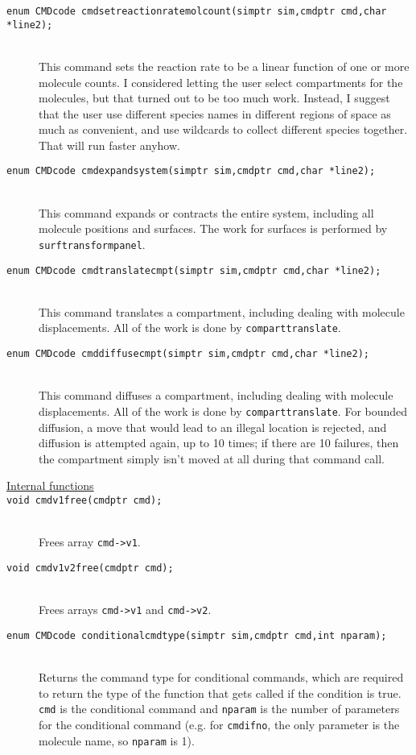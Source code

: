\documentclass {scrbook}
\newcommand {\ttt} {\texttt}
\begin{document}
\begin{description}
\item[\ttt{enum CMDcode cmdsetreactionratemolcount(simptr sim,cmdptr cmd,char *line2);}]
\hfill \\
This command sets the reaction rate to be a linear function of one or more molecule counts. I considered letting the user select compartments for the molecules, but that turned out to be too much work. Instead, I suggest that the user use different species names in different regions of space as much as convenient, and use wildcards to collect different species together. That will run faster anyhow.

\item[\ttt{enum CMDcode cmdexpandsystem(simptr sim,cmdptr cmd,char *line2);}]
\hfill \\
This command expands or contracts the entire system, including all molecule positions and surfaces. The work for surfaces is performed by \ttt{surftransformpanel}.

\item[\ttt{enum CMDcode cmdtranslatecmpt(simptr sim,cmdptr cmd,char *line2);}]
\hfill \\
This command translates a compartment, including dealing with molecule displacements. All of the work is done by \ttt{comparttranslate}.

\item[\ttt{enum CMDcode cmddiffusecmpt(simptr sim,cmdptr cmd,char *line2);}]
\hfill \\
This command diffuses a compartment, including dealing with molecule displacements. All of the work is done by \ttt{comparttranslate}. For bounded diffusion, a move that would lead to an illegal location is rejected, and diffusion is attempted again, up to 10 times; if there are 10 failures, then the compartment simply isn't moved at all during that command call.

\item[\underline{Internal functions}]

\item[\ttt{void cmdv1free(cmdptr cmd);}]
\hfill \\
Frees array \ttt{cmd->v1}.

\item[\ttt{void cmdv1v2free(cmdptr cmd);}]
\hfill \\
Frees arrays \ttt{cmd->v1} and \ttt{cmd->v2}.

\item[\ttt{enum CMDcode conditionalcmdtype(simptr sim,cmdptr cmd,int nparam);}]
\hfill \\
Returns the command type for conditional commands, which are required to return the type of the function that gets called if the condition is true. \ttt{cmd} is the conditional command and \ttt{nparam} is the number of parameters for the conditional command (e.g. for \ttt{cmdifno}, the only parameter is the molecule name, so \ttt{nparam} is 1).


\end{description}
\end{document}
